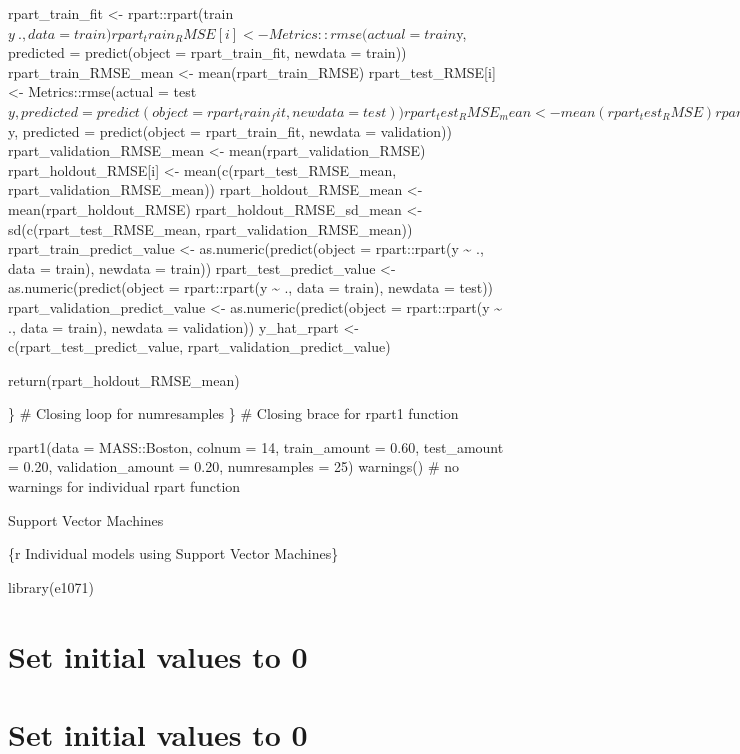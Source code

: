 \documentclass[
]{book}
\begin{document}
rpart\_train\_fit \textless- rpart::rpart(train\(y ~ ., data = train)
  rpart_train_RMSE[i] <- Metrics::rmse(actual = train\)y, predicted =
predict(object = rpart\_train\_fit, newdata = train))
rpart\_train\_RMSE\_mean \textless- mean(rpart\_train\_RMSE) rpart\_test\_RMSE{[}i{]} \textless-
Metrics::rmse(actual =
test\(y, predicted = predict(object = rpart_train_fit, newdata = test))
  rpart_test_RMSE_mean <- mean(rpart_test_RMSE)
  rpart_validation_RMSE[i] <- Metrics::rmse(actual = validation\)y,
predicted = predict(object = rpart\_train\_fit, newdata = validation))
rpart\_validation\_RMSE\_mean \textless- mean(rpart\_validation\_RMSE)
rpart\_holdout\_RMSE{[}i{]} \textless- mean(c(rpart\_test\_RMSE\_mean,
rpart\_validation\_RMSE\_mean)) rpart\_holdout\_RMSE\_mean \textless-
mean(rpart\_holdout\_RMSE) rpart\_holdout\_RMSE\_sd\_mean \textless-
sd(c(rpart\_test\_RMSE\_mean, rpart\_validation\_RMSE\_mean))
rpart\_train\_predict\_value \textless- as.numeric(predict(object = rpart::rpart(y
\textasciitilde{} ., data = train), newdata = train)) rpart\_test\_predict\_value \textless-
as.numeric(predict(object = rpart::rpart(y \textasciitilde{} ., data = train), newdata
= test)) rpart\_validation\_predict\_value \textless- as.numeric(predict(object =
rpart::rpart(y \textasciitilde{} ., data = train), newdata = validation)) y\_hat\_rpart
\textless- c(rpart\_test\_predict\_value, rpart\_validation\_predict\_value)

return(rpart\_holdout\_RMSE\_mean)

\} \# Closing loop for numresamples \} \# Closing brace for rpart1
function

rpart1(data = MASS::Boston, colnum = 14, train\_amount = 0.60,
test\_amount = 0.20, validation\_amount = 0.20, numresamples = 25)
warnings() \# no warnings for individual rpart function

Support Vector Machines

\{r Individual models using Support Vector Machines\}

library(e1071)

\chapter{Set initial values to 0}\label{set-initial-values-to-0-18}

\chapter{Set initial values to 0}\label{set-initial-values-to-0-19}
\end{document}
